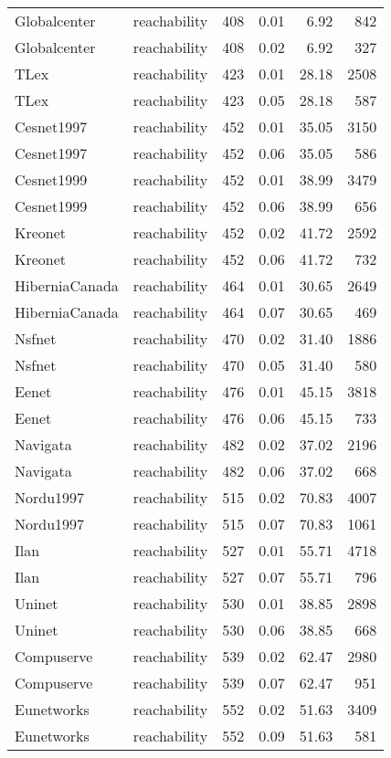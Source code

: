 \begin{tabular}{llrrrr}
Globalcenter & reachability & 408 & 0.01 & 6.92 & 842 \\
Globalcenter & reachability & 408 & 0.02 & 6.92 & 327 \\
TLex & reachability & 423 & 0.01 & 28.18 & 2508 \\
TLex & reachability & 423 & 0.05 & 28.18 & 587 \\
Cesnet1997 & reachability & 452 & 0.01 & 35.05 & 3150 \\
Cesnet1997 & reachability & 452 & 0.06 & 35.05 & 586 \\
Cesnet1999 & reachability & 452 & 0.01 & 38.99 & 3479 \\
Cesnet1999 & reachability & 452 & 0.06 & 38.99 & 656 \\
Kreonet & reachability & 452 & 0.02 & 41.72 & 2592 \\
Kreonet & reachability & 452 & 0.06 & 41.72 & 732 \\
HiberniaCanada & reachability & 464 & 0.01 & 30.65 & 2649 \\
HiberniaCanada & reachability & 464 & 0.07 & 30.65 & 469 \\
Nsfnet & reachability & 470 & 0.02 & 31.40 & 1886 \\
Nsfnet & reachability & 470 & 0.05 & 31.40 & 580 \\
Eenet & reachability & 476 & 0.01 & 45.15 & 3818 \\
Eenet & reachability & 476 & 0.06 & 45.15 & 733 \\
Navigata & reachability & 482 & 0.02 & 37.02 & 2196 \\
Navigata & reachability & 482 & 0.06 & 37.02 & 668 \\
Nordu1997 & reachability & 515 & 0.02 & 70.83 & 4007 \\
Nordu1997 & reachability & 515 & 0.07 & 70.83 & 1061 \\
Ilan & reachability & 527 & 0.01 & 55.71 & 4718 \\
Ilan & reachability & 527 & 0.07 & 55.71 & 796 \\
Uninet & reachability & 530 & 0.01 & 38.85 & 2898 \\
Uninet & reachability & 530 & 0.06 & 38.85 & 668 \\
Compuserve & reachability & 539 & 0.02 & 62.47 & 2980 \\
Compuserve & reachability & 539 & 0.07 & 62.47 & 951 \\
Eunetworks & reachability & 552 & 0.02 & 51.63 & 3409 \\
Eunetworks & reachability & 552 & 0.09 & 51.63 & 581 \\

\end{tabular}
